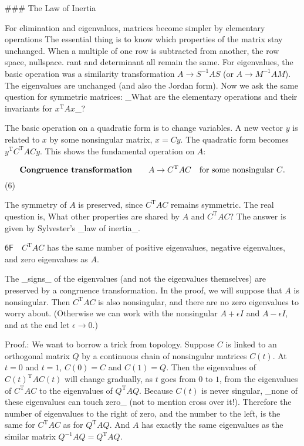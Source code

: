 

### The Law of Inertia

For elimination and eigenvalues, matrices become simpler by elementary operations The essential thing is to know which properties of the matrix stay unchanged. When a multiple of one row is subtracted from another, the row space, nullspace. rant and determinant all remain the same. For eigenvalues, the basic operation was a similarity transformation \(A\to S^{-1}AS\) (or \(A\to M^{-1}AM\)). The eigenvalues are unchanged (and also the Jordan form). Now we ask the same question for symmetric matrices: _What are the elementary operations and their invariants for \(x^{\mathrm{T}}Ax\)_?

The basic operation on a quadratic form is to change variables. A new vector \(y\) is related to \(x\) by some nonsingular matrix, \(x=Cy\). The quadratic form becomes \(y^{\mathrm{T}}C^{\mathrm{T}}ACy\). This shows the fundamental operation on \(A\):

\[\text{{\bf Congruence transformation}}\qquad A\to C^{\mathrm{T}}AC\quad\text{for some nonsingular $C$}.\] (6)

The symmetry of \(A\) is preserved, since \(C^{\mathrm{T}}AC\) remains symmetric. The real question is, What other properties are shared by \(A\) and \(C^{\mathrm{T}}AC\)? The answer is given by Sylvester's _law of inertia_.

\(\mathsf{6F}\quad C^{\mathrm{T}}AC\) has the same number of positive eigenvalues, negative eigenvalues, and zero eigenvalues as \(A\).

The _signs_ of the eigenvalues (and not the eigenvalues themselves) are preserved by a congruence transformation. In the proof, we will suppose that \(A\) is nonsingular. Then \(C^{\mathrm{T}}AC\) is also nonsingular, and there are no zero eigenvalues to worry about. (Otherwise we can work with the nonsingular \(A+\epsilon I\) and \(A-\epsilon I\), and at the end let \(\epsilon\to 0\).)

Proof.: We want to borrow a trick from topology. Suppose \(C\) is linked to an orthogonal matrix \(Q\) by a continuous chain of nonsingular matrices \(C(t)\). At \(t=0\) and \(t=1\), \(C(0)=C\) and \(C(1)=Q\). Then the eigenvalues of \(C(t)^{\mathrm{T}}AC(t)\) will change gradually, as \(t\) goes from \(0\) to \(1\), from the eigenvalues of \(C^{\mathrm{T}}AC\) to the eigenvalues of \(Q^{\mathrm{T}}AQ\). Because \(C(t)\) is never singular, _none of these eigenvalues can touch zero_ (not to mention cross over it!). Therefore the number of eigenvalues to the right of zero, and the number to the left, is the same for \(C^{\mathrm{T}}AC\) as for \(Q^{\mathrm{T}}AQ\). And \(A\) has exactly the same eigenvalues as the similar matrix \(Q^{-1}AQ=Q^{\mathrm{T}}AQ\).

